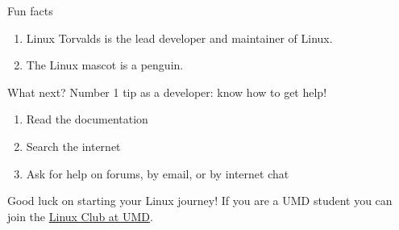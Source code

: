 \documentclass[presentation]{beamer}
\begin{document}
\begin{frame}[label={sec:orgd2c1c13}]{Fun facts}
\begin{enumerate}
\item Linux Torvalds is the lead developer and maintainer of Linux.
\item The Linux mascot is a penguin.
\end{enumerate}
\end{frame}

\begin{frame}[label={sec:org5d92043}]{What next?}
Number 1 tip as a developer: know how to get help!

\begin{enumerate}
\item Read the documentation
\item Search the internet
\item Ask for help on forums, by email, or by internet chat
\end{enumerate}

Good luck on starting your Linux journey! If you are a UMD student you can join the \href{https://terplink.umd.edu/organization/linux-club-at-umd}{Linux Club at UMD}.
\end{frame}
\end{document}
